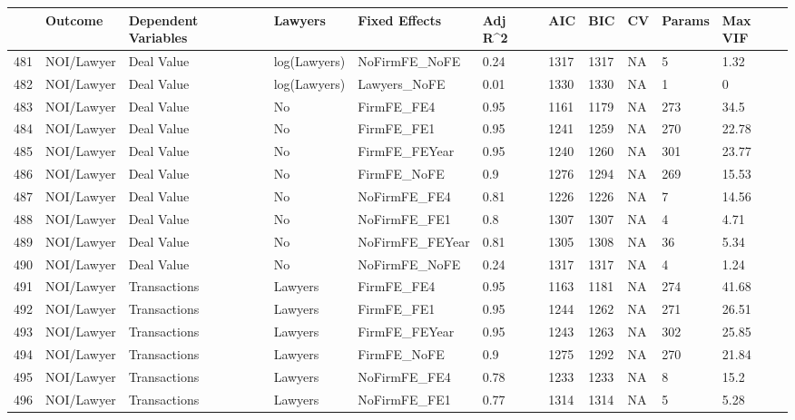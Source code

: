 \begin{table}[ht]
\centering
\begin{tabular}{rllllllllll}
  \hline
 & Outcome & Dependent Variables & Lawyers & Fixed Effects & Adj R^2 & AIC & BIC & CV & Params & Max VIF \\ 
  \hline
481 & NOI/Lawyer & Deal Value & log(Lawyers) & NoFirmFE\_NoFE & 0.24 & 1317 & 1317 & NA & 5 & 1.32 \\ 
  482 & NOI/Lawyer & Deal Value & log(Lawyers) & Lawyers\_NoFE & 0.01 & 1330 & 1330 & NA & 1 & 0 \\ 
  483 & NOI/Lawyer & Deal Value & No & FirmFE\_FE4 & 0.95 & 1161 & 1179 & NA & 273 & 34.5 \\ 
  484 & NOI/Lawyer & Deal Value & No & FirmFE\_FE1 & 0.95 & 1241 & 1259 & NA & 270 & 22.78 \\ 
  485 & NOI/Lawyer & Deal Value & No & FirmFE\_FEYear & 0.95 & 1240 & 1260 & NA & 301 & 23.77 \\ 
  486 & NOI/Lawyer & Deal Value & No & FirmFE\_NoFE & 0.9 & 1276 & 1294 & NA & 269 & 15.53 \\ 
  487 & NOI/Lawyer & Deal Value & No & NoFirmFE\_FE4 & 0.81 & 1226 & 1226 & NA & 7 & 14.56 \\ 
  488 & NOI/Lawyer & Deal Value & No & NoFirmFE\_FE1 & 0.8 & 1307 & 1307 & NA & 4 & 4.71 \\ 
  489 & NOI/Lawyer & Deal Value & No & NoFirmFE\_FEYear & 0.81 & 1305 & 1308 & NA & 36 & 5.34 \\ 
  490 & NOI/Lawyer & Deal Value & No & NoFirmFE\_NoFE & 0.24 & 1317 & 1317 & NA & 4 & 1.24 \\ 
  491 & NOI/Lawyer & Transactions & Lawyers & FirmFE\_FE4 & 0.95 & 1163 & 1181 & NA & 274 & 41.68 \\ 
  492 & NOI/Lawyer & Transactions & Lawyers & FirmFE\_FE1 & 0.95 & 1244 & 1262 & NA & 271 & 26.51 \\ 
  493 & NOI/Lawyer & Transactions & Lawyers & FirmFE\_FEYear & 0.95 & 1243 & 1263 & NA & 302 & 25.85 \\ 
  494 & NOI/Lawyer & Transactions & Lawyers & FirmFE\_NoFE & 0.9 & 1275 & 1292 & NA & 270 & 21.84 \\ 
  495 & NOI/Lawyer & Transactions & Lawyers & NoFirmFE\_FE4 & 0.78 & 1233 & 1233 & NA & 8 & 15.2 \\ 
  496 & NOI/Lawyer & Transactions & Lawyers & NoFirmFE\_FE1 & 0.77 & 1314 & 1314 & NA & 5 & 5.28 \\ 

\end{tabular}
\end{table}
